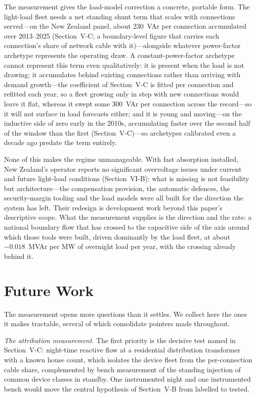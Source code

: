 \documentclass[journal]{IEEEtran}
\begin{document}
The measurement gives the load-model correction a concrete, portable form. The
light-load fleet needs a net standing shunt term that scales with
connections served---on the New Zealand panel, about 230~VAr per connection
accumulated over 2013--2025 (Section~V-C; a boundary-level figure that carries
each connection's share of network cable with it)---alongside
whatever power-factor archetype represents the operating draw. A
constant-power-factor archetype cannot represent this term even qualitatively:
it is present when the load is not drawing; it accumulates behind
existing connections rather than arriving with demand growth---the coefficient
of Section~V-C is fitted per connection and refitted each year, so a fleet
growing only in step with new connections would leave it flat, whereas it swept
some 300~VAr per connection across the record---so it will not surface in load
forecasts either; and it is young and moving---on the inductive side of zero
early in the 2010s, accumulating faster over the second half of the window than
the first (Section~V-C)---so archetypes calibrated even a decade ago predate
the term entirely.

None of this makes the regime unmanageable. With fast absorption installed, New
Zealand's operator reports no significant overvoltage issues under current and
future light-load conditions (Section~VI-B): what is missing is not feasibility
but architecture---the compensation provision, the automatic defences, the
security-margin tooling and the load models were all built for the direction the
system has left. Their redesign is
development work beyond this paper's descriptive scope. What the measurement
supplies is the direction and the rate: a national boundary flow that has
crossed to the capacitive side of the axis around which those tools were built,
driven dominantly by the load fleet, at about $-0.018$~MVAr per MW of overnight
load per year, with the crossing already behind it.

\section{Future Work}
The measurement opens more questions than it settles. We collect here the ones
it makes tractable, several of which consolidate pointers made throughout.

\emph{The attribution measurement.} The first priority is the decisive test
named in Section~V-C: night-time reactive flow at a residential distribution
transformer with a known house count, which isolates the device fleet from the
per-connection cable share, complemented by bench measurement of the standing
injection of common device classes in standby. One instrumented night and one
instrumented bench would move the central hypothesis of Section~V-B from
labelled to tested.
\end{document}
